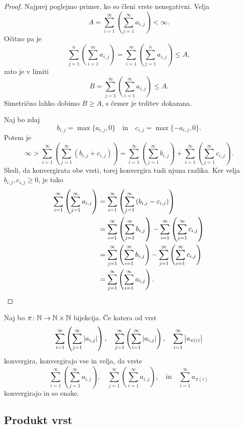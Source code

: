 \documentclass[12pt, a4paper]{article}
\begin{document}
\begin{proof}
Najprej poglejmo primer, ko so členi vrste nenegativni. Velja
\[
A=\sum_{i=1}^\infty\left(\sum_{j=1}^\infty a_{i,j}\right)<\infty.
\]
Očitno pa je
\[
\sum_{j=1}^n\left(\sum_{i=1}^m a_{i,j}\right)=\sum_{i=1}^m\left(\sum_{j=1}^n a_{i,j}\right)\leq A,
\]
zato je v limiti
\[
B=\sum_{j=1}^\infty\left(\sum_{i=1}^\infty a_{i,j}\right)\leq A.
\]
Simetrično lahko dobimo $B\geq A$, s čemer je trditev dokazana.

Naj bo zdaj
\[
b_{i,j}=\max\{a_{i,j},0\}\quad\text{in}\quad c_{i,j}=\max\{-a_{i,j},0\}.
\]
Potem je
\[
\infty>\sum_{i=1}^\infty\left(\sum_{j=1}^\infty \left(b_{i,j}+c_{i,j}\right)\right)=\sum_{i=1}^\infty\left(\sum_{j=1}^\infty b_{i,j}\right)+\sum_{i=1}^\infty\left(\sum_{j=1}^\infty c_{i,j}\right).
\]
Sledi, da konvergirata obe vrsti, torej konvergira tudi njuna razlika. Ker velja $b_{i,j},c_{i,j}\geq 0$, je tako
\begin{align*}
\sum_{i=1}^\infty\left(\sum_{j=1}^\infty a_{i,j}\right)&=\sum_{i=1}^\infty\left(\sum_{j=1}^\infty \left(b_{i,j}-c_{i,j}\right)\right)
\\
&=\sum_{i=1}^\infty\left(\sum_{j=1}^\infty b_{i,j}\right)-\sum_{i=1}^\infty\left(\sum_{j=1}^\infty c_{i,j}\right)
\\
&=\sum_{j=1}^\infty\left(\sum_{i=1}^\infty b_{i,j}\right)-\sum_{j=1}^\infty\left(\sum_{i=1}^\infty c_{i,j}\right)
\\
&=\sum_{j=1}^\infty\left(\sum_{i=1}^\infty a_{i,j}\right).\qedhere
\end{align*}
\end{proof}

\begin{izrek}
Naj bo $\pi\colon\mathbb{N}\to\mathbb{N}\times\mathbb{N}$ bijekcija. Če katera od vrst
\[
\sum_{i=1}^\infty\left(\sum_{j=1}^\infty\left\lvert a_{i,j}\right\rvert\right),\quad \sum_{j=1}^\infty\left(\sum_{i=1}^\infty\left\lvert a_{i,j}\right\rvert\right),\quad\sum_{i=1}^\infty \left\lvert a_{\pi(i)}\right\rvert
\]
konvergira, konvergirajo vse in velja, da vrste
\[
\sum_{i=1}^\infty\left(\sum_{j=1}^\infty a_{i,j}\right),\quad \sum_{j=1}^\infty\left(\sum_{i=1}^\infty a_{i,j}\right),\quad\text{in}\quad\sum_{i=1}^\infty a_{\pi(i)}
\]
konvergirajo in so enake.
\end{izrek}


\newpage

\subsection{Produkt vrst}
\end{document}

